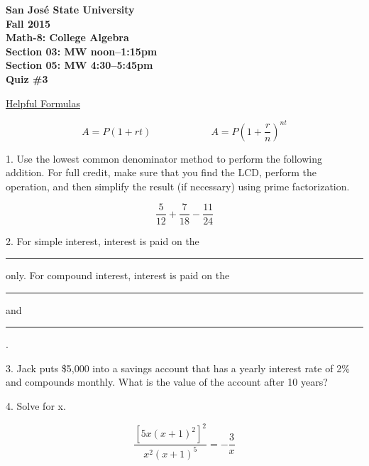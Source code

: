 \documentclass[letterpaper, 12pt]{article}
\begin{document}
\begin{center}
\bfseries
San Jos\'{e} State University \\
Fall 2015 \\
Math-8: College Algebra \\
Section 03: MW noon--1:15pm \\
Section 05: MW 4:30--5:45pm \\
\bigskip
Quiz \#3
\end{center}

\bigskip

\newcommand{\fillin}{\rule{1in}{1pt}}

\underline{Helpful Formulas}

\[A=P\left(1+rt\right)\hspace{1in}A=P\left(1+\frac{r}{n}\right)^{nt}\]

\bigskip

1. Use the lowest common denominator method to perform the following addition.
For full credit, make sure that you find the LCD, perform the operation, and
then simplify the result (if necessary) using prime factorization.

\[\frac{5}{12}+\frac{7}{18}-\frac{11}{24}\]

\vspace{3in}

2. For simple interest, interest is paid on the \fillin only.  For compound
interest, interest is paid on the \fillin and \fillin.

\newpage

3. Jack puts \$5,000 into a savings account that has a yearly interest rate of
2\% and compounds monthly.  What is the value of the account after 10 years?

\vspace{3in}

4. Solve for x.

\[\frac{\left[5x\left(x+1\right)^2\right]^2}{x^2(x+1)^5}=-\frac{3}{x}\]
\end{document}
